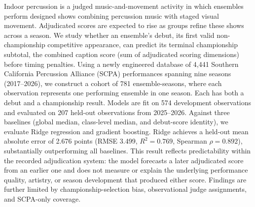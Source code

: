 Indoor percussion is a judged music-and-movement activity in which ensembles
perform designed shows combining percussion music with staged visual movement.
Adjudicated scores are expected to rise as groups refine these shows across a
season.
We study whether an ensemble's debut, its first valid non-championship
competitive appearance, can predict its terminal championship subtotal, the
combined caption score (sum of adjudicated scoring dimensions) before timing penalties.
Using a newly engineered database of 4,441 Southern California Percussion
Alliance (SCPA) performances spanning nine seasons (2017--2026), we construct
a cohort of 781 ensemble-seasons, where each observation represents one
performing ensemble in one season. Each has both a debut and a championship
result. Models are fit on 574 development observations and
evaluated on 207 held-out observations from 2025--2026. Against three baselines (global
median, class-level median, and debut-score identity), we evaluate Ridge
regression and gradient boosting. Ridge achieves a held-out mean absolute
error of 2.676 points (RMSE 3.499, $R^2 = 0.769$, Spearman $\rho = 0.892$),
substantially outperforming all baselines. This result reflects predictability
within the recorded adjudication system: the model forecasts a later
adjudicated score from an earlier one and does not measure or explain the
underlying performance quality, artistry, or season development that produced
either score. Findings are further limited by championship-selection bias,
observational judge assignments, and SCPA-only coverage.
